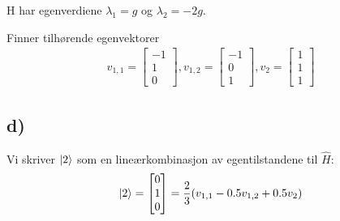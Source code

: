 \documentclass[norsk,a4paper,12pt]{article}
\begin{document}
	H har egenverdiene $\lambda_1 = g$ og $\lambda_2 = -2g$.
	
	Finner tilhørende egenvektorer
	\begin{equation}
	\begin{aligned}
	v_{1,1} = \left[ \begin{matrix} -1 \\ 1 \\ 0 \end{matrix} \right], 
	v_{1,2} = \left[ \begin{matrix} -1 \\ 0 \\ 1 \end{matrix} \right], 
	v_2 = \left[ \begin{matrix} 1 \\ 1 \\ 1 \end{matrix} \right]
	\end{aligned}
	\end{equation}
	
	\subsection*{d)}
	Vi skriver $\ket{2}$ som en lineærkombinasjon av egentilstandene til $\hat{H}$:
	\begin{equation}
	\begin{aligned}
	\ket{2} = \left[ \begin{matrix} 0 \\ 1 \\ 0 \end{matrix} \right] = \frac{2}{3}(v_{1,1} - 0.5v_{1,2} + 0.5 v_2)
	\end{aligned}
	\end{equation}
	
\end{document}
